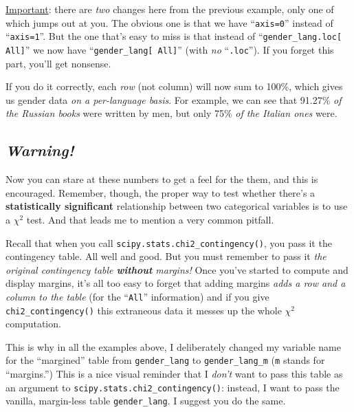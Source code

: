 \underline{Important}: there are \textit{two} changes here from the previous
example, only one of which jumps out at you. The obvious one is that we have
``\texttt{axis=0}'' instead of ``\texttt{axis=1}''. But the one that's easy to
miss is that instead of ``\texttt{gender\_lang.loc[\textquotesingle
All\textquotesingle ]}'' we now have ``\texttt{gender\_lang[\textquotesingle
All\textquotesingle ]}'' (with \textit{no} ``\texttt{.loc}''). If you forget
this part, you'll get nonsense.

If you do it correctly, each \textit{row} (not column) will now sum to 100\%,
which gives us gender data \textit{on a per-language basis}. For example,
we can see that 91.27\% \textit{of the Russian books} were written by
men, but only 75\% \textit{of the Italian ones} were.

\subsection{\textit{Warning!}}


Now you can stare at these numbers to get a feel for the them, and this is
encouraged. Remember, though, the proper way to test whether there's a
\textbf{statistically significant} relationship between two categorical
variables is to use a $\chi ^2$ test. And that leads me to mention a very
common pitfall.


Recall that when you call \texttt{scipy.stats.chi2\_contingency()}, you pass it
the contingency table. All well and good. But you must remember to pass it
\textit{the original contingency table \textbf{without} margins!} Once you've
started to compute and display margins, it's all too easy to forget that adding
margins \textit{adds a row and a column to the table} (for the ``\texttt{All}''
information) and if you give \texttt{chi2\_contingency()} this extraneous data
it messes up the whole $\chi ^2$ computation.

This is why in all the examples above, I deliberately changed my variable name
for the ``margined'' table from \texttt{gender\_lang} to\linebreak
\texttt{gender\_lang\_m} (\texttt{m} stands for ``margins.'') This is a nice
visual reminder that I \textit{don't} want to pass this table as an argument to
\texttt{scipy.stats.chi2\_contingency()}: instead, I want to pass the vanilla,
margin-less table \texttt{gender\_lang}. I suggest you do the same.

